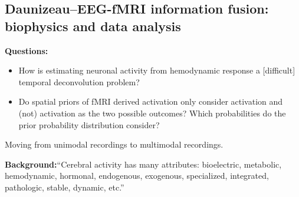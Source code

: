 \documentclass{article}
\begin{document}
        \subsection{Daunizeau--EEG-fMRI information fusion: biophysics and data 
    analysis}
            \textbf{Questions:}
            \begin{itemize}
                \item How is estimating neuronal activity from hemodynamic
response a [difficult] temporal deconvolution problem?
                \item Do spatial priors of fMRI derived activation only consider
activation and (not) activation as the two possible outcomes? Which
probabilities do the prior probability distribution consider?
            \end{itemize}     
            Moving from unimodal recordings to multimodal recordings. 

            \textbf{Background:}``Cerebral activity has many attributes: bioelectric,
            metabolic, hemodynamic, hormonal, endogenous, exogenous, specialized, 
    integrated,
            pathologic, stable, dynamic, etc.'' 
\end{document}
